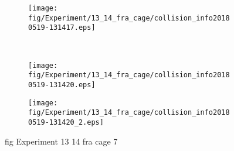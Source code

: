 \begin{figure}[H]
	\centering
	\begin{subfigure}[b]{0.45\textwidth}
		\texttt{[image: fig/Experiment/13\_14\_fra\_cage/collision\_info20180519-131417.eps]}
		\caption{}
		\label{fig:Experiment:13_14_fra_cage:collision_info20180519-131417}
	\end{subfigure}
	~
	\begin{subfigure}[b]{0.45\textwidth}
		\texttt{[image: fig/Experiment/13\_14\_fra\_cage/collision\_info20180519-131420.eps]}
		\caption{}
		\label{fig:Experiment:13_14_fra_cage:collision_info20180519-131420}
	\end{subfigure}

	\begin{subfigure}[b]{0.45\textwidth}
		\texttt{[image: fig/Experiment/13\_14\_fra\_cage/collision\_info20180519-131420\_2.eps]}
		\caption{}
		\label{fig:Experiment:13_14_fra_cage:collision_info20180519-131420_2}
	\end{subfigure}
	\caption{fig Experiment 13 14 fra cage 7}
	\label{fig:Experiment:13_14_fra_cage:7}
\end{figure}

